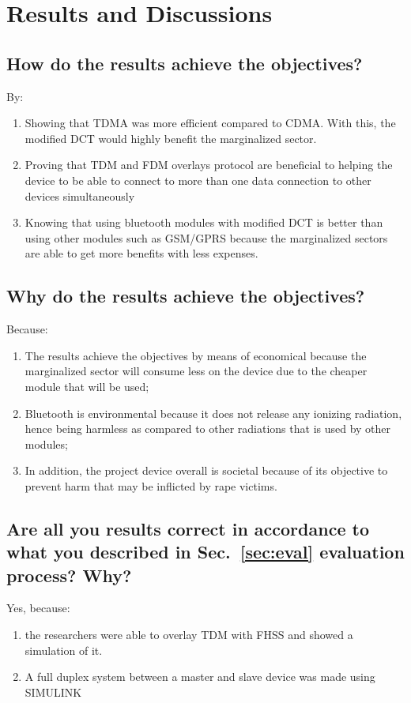 \section{Results and Discussions}

\subsection{How do the results achieve the objectives?}
By:
\begin{enumerate}
	\item Showing that TDMA was more efficient compared to CDMA. With this, the modified DCT would highly benefit the marginalized sector.
	\item Proving that TDM and FDM overlays protocol are beneficial to helping the device to be able to connect to more than one data connection to other devices simultaneously
	\item Knowing that using bluetooth modules with modified DCT is better than using other modules such as GSM/GPRS because the marginalized sectors are able to get more benefits with less expenses.
	
\end{enumerate}

\subsection{Why do the results achieve the objectives?}
Because:
\begin{enumerate}
	\item The results achieve the objectives by means of economical because the marginalized sector will consume less on the device due to the cheaper module that will be used; 
	
	\item Bluetooth is environmental because it does not release any ionizing radiation, hence being harmless as compared to other radiations that is used by other modules;
	
	\item In addition, the project device overall is societal because of its objective to prevent harm that may be inflicted by rape victims.
	
\end{enumerate}

\subsection{Are all you results correct  in accordance to what you described in Sec.~\ref{sec:eval} evaluation process? Why?} 
Yes, because:
\begin{enumerate}
	\item the researchers were able to overlay TDM with FHSS and showed a simulation of it.
	\item A full duplex system between a master and slave device was made using SIMULINK
\end{enumerate}

